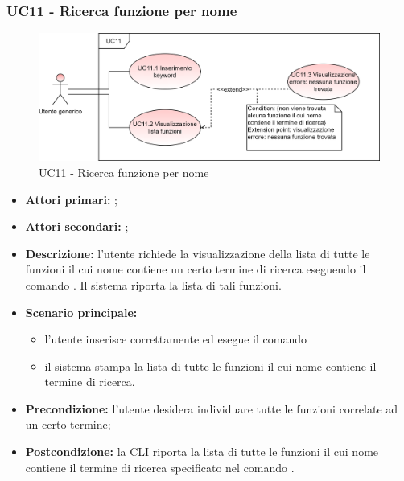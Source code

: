 \subsubsection{UC11 - Ricerca funzione per nome}
\begin{figure}[h]
	\centering
	\includegraphics[scale=\ucs]{./res/img/UC11.png}
	\caption {UC11 - Ricerca funzione per nome}
\end{figure}
\begin{itemize}
	\item \textbf{Attori primari:} \ua{};
	\item \textbf{Attori secondari:} \re{};
	\item \textbf{Descrizione:} l’utente richiede la visualizzazione della lista di tutte le funzioni il cui nome contiene un certo termine di ricerca eseguendo il comando \psearch{}. Il sistema riporta la lista di tali funzioni. 
	\item \textbf{Scenario principale:} 
	\begin{itemize}
		\item l’utente inserisce correttamente ed esegue il comando \psearch{} 
		\item il sistema stampa la lista di tutte le funzioni il cui nome contiene il termine di ricerca.
	\end{itemize}
	\item \textbf{Precondizione:} l’utente desidera individuare tutte le funzioni correlate ad un certo termine;
	\item \textbf{Postcondizione:} la CLI riporta la lista di tutte le funzioni il cui nome contiene il termine di ricerca specificato nel comando \search{}.
\end{itemize}